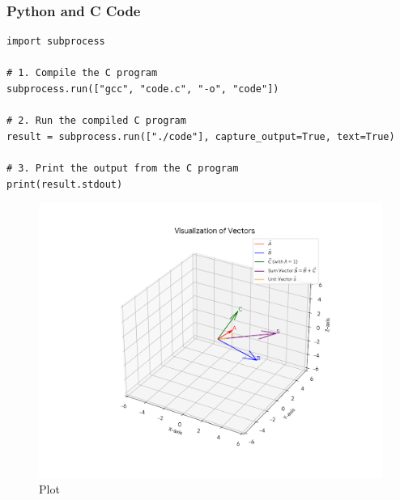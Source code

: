 \documentclass{beamer}
\begin{document}
\begin{frame}[fragile]
\frametitle{Python and C Code}

\begin{lstlisting}
import subprocess

# 1. Compile the C program
subprocess.run(["gcc", "code.c", "-o", "code"])

# 2. Run the compiled C program
result = subprocess.run(["./code"], capture_output=True, text=True)

# 3. Print the output from the C program
print(result.stdout)
\end{lstlisting}

\end{frame}

\begin{figure}[H]
    \centering
    \includegraphics[width=0.7\columnwidth]{Fig.png}
    \caption{Plot}
    \label{fig:placeholder}
\end{figure}
\end{document}
